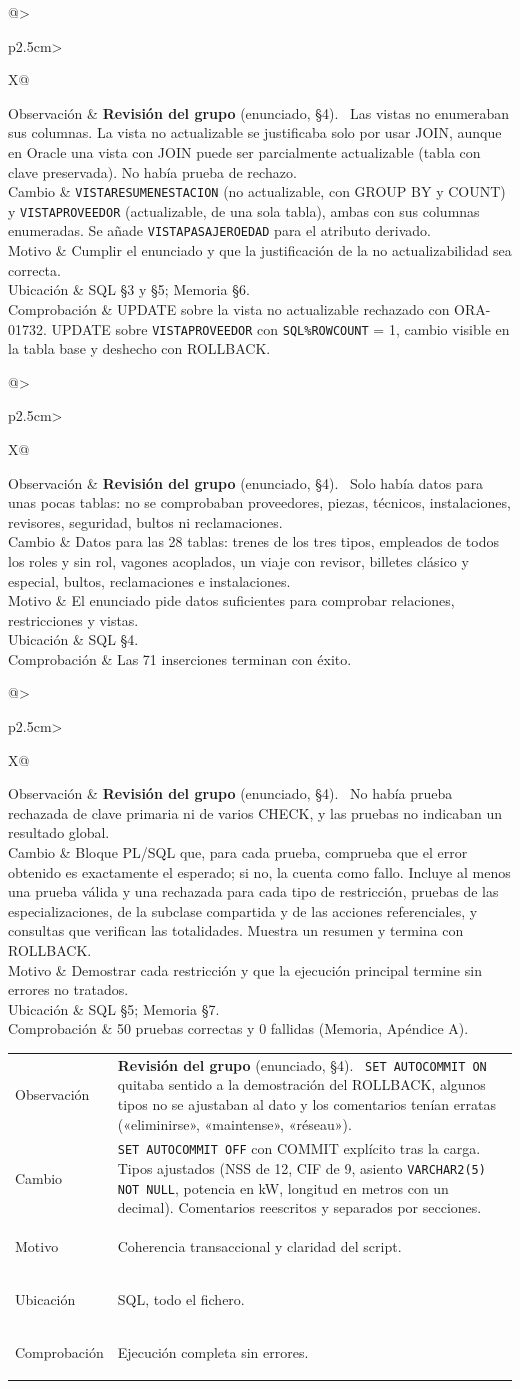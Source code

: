 \documentclass[11pt,a4paper]{article}
\makeatletter
\DeclareRobustCommand{\_}{\textunderscore\allowbreak}
\newcommand{\tb}[1]{\texttt{#1}}
\newcommand{\REV}[1]{\textbf{Revisión del grupo} (enunciado, #1).~}
\newcommand{\cambio}[7]{%
\begin{tcolorbox}[colback=white,colframe=azuluvigo,colbacktitle=azuluvigo!8,coltitle=azuluvigo,
  title={\textbf{#1}\quad #2},fonttitle=\normalsize,boxrule=0.6pt,arc=1mm,
  left=2mm,right=2mm,top=1mm,bottom=1mm,before skip=6pt,after skip=6pt]
\small
\begin{tabularx}{\linewidth}{@{}>{\bfseries\raggedright\arraybackslash}p{2.5cm}>{\raggedright\arraybackslash}X@{}}
Observación & #3\\
Cambio & #4\\
Motivo & #5\\
Ubicación & #6\\
Comprobación & #7\\
\end{tabularx}
\end{tcolorbox}}
\makeatother
\begin{document}
\cambio{S-07}{Vistas}
{\REV{§4} Las vistas no enumeraban sus columnas. La vista no actualizable se justificaba solo por usar JOIN, aunque en Oracle una vista con JOIN puede ser parcialmente actualizable (tabla con clave preservada). No había prueba de rechazo.}
{\tb{VISTA\_RESUMEN\_ESTACION} (no actualizable, con GROUP BY y COUNT) y \tb{VISTA\_PROVEEDOR} (actualizable, de una sola tabla), ambas con sus columnas enumeradas. Se añade \tb{VISTA\_PASAJERO\_EDAD} para el atributo derivado.}
{Cumplir el enunciado y que la justificación de la no actualizabilidad sea correcta.}
{SQL §3 y §5; Memoria §6.}
{UPDATE sobre la vista no actualizable rechazado con ORA-01732. UPDATE sobre \tb{VISTA\_PROVEEDOR} con \tb{SQL\%ROWCOUNT} = 1, cambio visible en la tabla base y deshecho con ROLLBACK.}

\cambio{S-08}{Datos de prueba}
{\REV{§4} Solo había datos para unas pocas tablas: no se comprobaban proveedores, piezas, técnicos, instalaciones, revisores, seguridad, bultos ni reclamaciones.}
{Datos para las 28 tablas: trenes de los tres tipos, empleados de todos los roles y sin rol, vagones acoplados, un viaje con revisor, billetes clásico y especial, bultos, reclamaciones e instalaciones.}
{El enunciado pide datos suficientes para comprobar relaciones, restricciones y vistas.}
{SQL §4.}
{Las 71 inserciones terminan con éxito.}

\cambio{S-09}{Batería de pruebas}
{\REV{§4} No había prueba rechazada de clave primaria ni de varios CHECK, y las pruebas no indicaban un resultado global.}
{Bloque PL/SQL que, para cada prueba, comprueba que el error obtenido es exactamente el esperado; si no, la cuenta como fallo. Incluye al menos una prueba válida y una rechazada para cada tipo de restricción, pruebas de las especializaciones, de la subclase compartida y de las acciones referenciales, y consultas que verifican las totalidades. Muestra un resumen y termina con ROLLBACK.}
{Demostrar cada restricción y que la ejecución principal termine sin errores no tratados.}
{SQL §5; Memoria §7.}
{50 pruebas correctas y 0 fallidas (Memoria, Apéndice A).}

\cambio{S-10}{Transacciones, tipos y comentarios}
{\REV{§4} \tb{SET AUTOCOMMIT ON} quitaba sentido a la demostración del ROLLBACK, algunos tipos no se ajustaban al dato y los comentarios tenían erratas («eliminirse», «maintense», «réseau»).}
{\tb{SET AUTOCOMMIT OFF} con COMMIT explícito tras la carga. Tipos ajustados (NSS de 12, CIF de 9, asiento \tb{VARCHAR2(5) NOT NULL}, potencia en kW, longitud en metros con un decimal). Comentarios reescritos y separados por secciones.}
{Coherencia transaccional y claridad del script.}
{SQL, todo el fichero.}
{Ejecución completa sin errores.}
\end{document}
